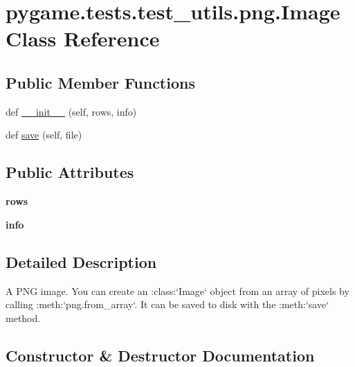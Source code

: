 \hypertarget{classpygame_1_1tests_1_1test__utils_1_1png_1_1_image}{}\section{pygame.\+tests.\+test\+\_\+utils.\+png.\+Image Class Reference}
\label{classpygame_1_1tests_1_1test__utils_1_1png_1_1_image}
\subsection*{Public Member Functions}
\begin{DoxyCompactItemize}
\item 
def \hyperlink{classpygame_1_1tests_1_1test__utils_1_1png_1_1_image_aa28ac2b26569ea4823e754729839bbf5}{\+\_\+\+\_\+init\+\_\+\+\_\+} (self, rows, info)
\item 
def \hyperlink{classpygame_1_1tests_1_1test__utils_1_1png_1_1_image_a298487df13c064d01c79ded3b4c202e4}{save} (self, file)
\end{DoxyCompactItemize}
\subsection*{Public Attributes}
\begin{DoxyCompactItemize}
\item 
\mbox{\label{classpygame_1_1tests_1_1test__utils_1_1png_1_1_image_abc540e8f794261930a0af0fd9b914f4f}} 
{\bfseries rows}
\item 
\mbox{\label{classpygame_1_1tests_1_1test__utils_1_1png_1_1_image_aa564a28067649f0110ccbcdda1273a69}} 
{\bfseries info}
\end{DoxyCompactItemize}


\subsection{Detailed Description}
\begin{DoxyVerb}A PNG image.
You can create an :class:`Image` object from an array of pixels by calling
:meth:`png.from_array`.  It can be saved to disk with the
:meth:`save` method.\end{DoxyVerb}
 

\subsection{Constructor \& Destructor Documentation}
\mbox{\label{classpygame_1_1tests_1_1test__utils_1_1png_1_1_image_aa28ac2b26569ea4823e754729839bbf5}} 
